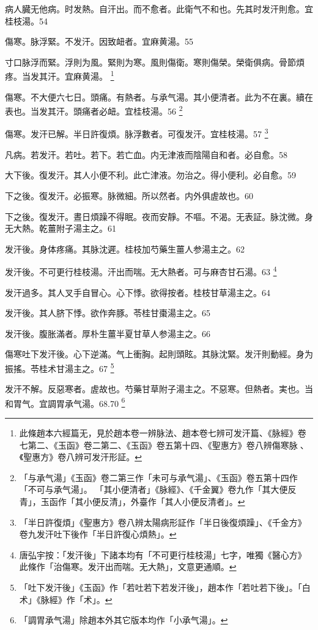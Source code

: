 病人臓无他病。时发熱。自汗出。而不愈者。此衛气不和也。先其时发汗則愈。宜桂枝湯。54

傷寒。脉浮緊。不发汗。因致衄者。宜麻黄湯。55

{\khaai 寸口}脉浮而緊。浮則为風。緊則为寒。風則傷衛。寒則傷榮。榮衛俱病。骨節煩疼。当发其汗。{\khaai 宜麻黄湯。}
	\footnote{
		此條趙本六經篇无，見於趙本卷一辨脉法、趙本卷七辨可发汗篇、《脉經》卷七第二、《玉函》卷二第二、《玉函》卷五第十四、《聖惠方》卷八辨傷寒脉{\sungii 𠊱}、《聖惠方》卷八辨可发汗形証。
	}

傷寒。不大便六七日。頭痛。有熱者。与承气湯。其小便清者。此为不在裏。續在表也。当发其汗。頭痛者必衄。宜桂枝湯。56
	\footnote{
		「与承气湯」《玉函》卷二第三作「未可与承气湯」、《玉函》卷五第十四作「不可与承气湯」。
		「其小便清者」《脉經》、《千金翼》卷九作「其大便反青」，玉函作「其小便反清」，外臺作「其人小便反清者」。
	}

傷寒。发汗已解。半日許復煩。脉浮數者。可復发汗。宜桂枝湯。57
	\footnote{
		「半日許復煩」《聖惠方》卷八辨太陽病形証作「半日後復煩躁」、《千金方》卷九发汗吐下後作「半日許復心煩熱」。
	}

凡病。若发汗。若吐。若下。若亡血。{\khaai 内}无津液而陰陽自和者。必自愈。58

大下後。復发汗。其人小便不利。此亡津液。勿治之。得小便利。必自愈。59

下之後。復发汗。必振寒。脉微細。所以然者。内外俱虗故也。60

下之後。復发汗。晝日煩躁不得眠。夜而安靜。不嘔。不渴。无表証。脉沈微。身无大熱。乾薑附子湯主之。61

发汗後。身体疼痛。其脉沈遲。桂枝加芍藥生薑人参湯主之。62

发汗後。不可更行桂枝湯。汗出而喘。无大熱者。可与麻杏甘石湯。63
	\footnote{
		唐弘宇按：「发汗後」下諸本均有「不可更行桂枝湯」七字，唯獨《醫心方》此條作「治傷寒。发汗出而喘。无大熱」，文意更通順。
	}

发汗過多。其人叉手自冒心。心下悸。欲得按者。桂枝甘草湯主之。64

发汗後。其人脐下悸。欲作奔豚。苓桂甘棗湯主之。65

发汗後。腹胀滿者。厚朴生薑半夏甘草人参湯主之。66

傷寒吐下发汗後。心下逆滿。气上衝胸。起則頭眩。其脉沈緊。发汗則動經。身为振搖。苓桂术甘湯主之。67
	\footnote{
		「吐下发汗後」《玉函》作「若吐若下若发汗後」，趙本作「若吐若下後」。「白术」《脉經》作「术」。
	}

发汗不解。反惡寒者。虗故也。芍藥甘草附子湯主之。不惡寒。但熱者。実也。当和胃气。宜調胃承气湯。68.70
	\footnote{
		「調胃承气湯」除趙本外其它版本均作「小承气湯」。
	}

